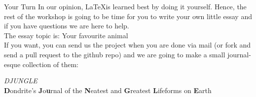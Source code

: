 \documentclass[aspectratio=169]{beamer}
\begin{document}
\begin{frame}{Your Turn}
    In our opinion, \LaTeX is learned best by doing it yourself. Hence, the rest of the workshop is going to be time for you to write your own little essay and if you have questions we are here to help.\\
    The essay topic is: Your favourite animal\\
    If you want, you can send us the project when you are done via mail (or fork and send a pull request to the github repo) and we are going to make a small journal-esque collection of them:\\
    \begin{center}
        \textit{\huge DJUNGLE}\\
        \textbf{D}ondrite's \textbf{J}o\textbf{u}rnal of the \textbf{N}eatest and \textbf{G}reatest \textbf{L}ifeforms on \textbf{E}arth
    \end{center}
\end{frame}
\end{document}
